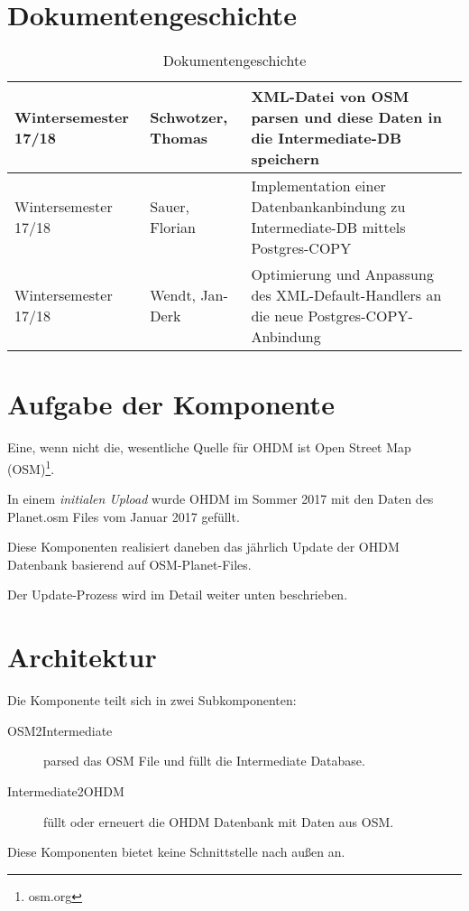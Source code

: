 \section{Dokumentengeschichte}
\begin{table}[h]
 \begin{tabular}{|l|l|p{4cm}|}
\hline
		Wintersemester 17/18 & Schwotzer, Thomas & XML-Datei von OSM parsen und diese Daten in die Intermediate-DB speichern\\
		\hline
		
		Wintersemester 17/18 & Sauer, Florian & Implementation einer Datenbankanbindung zu Intermediate-DB mittels Postgres-COPY \\
		\hline
		Wintersemester 17/18 & Wendt, Jan-Derk & Optimierung und Anpassung des XML-Default-Handlers an die neue Postgres-COPY-Anbindung\\
		\hline
 \end{tabular}
 \caption{Dokumentengeschichte}
 \end{table}

\section{Aufgabe der Komponente}
Eine, wenn nicht die, wesentliche Quelle für OHDM ist Open Street 
Map (OSM)\footnote{osm.org}.

In einem {\it initialen Upload} wurde OHDM im Sommer 2017 mit
den Daten des Planet.osm Files vom Januar 2017 gefüllt.

Diese Komponenten realisiert daneben das jährlich Update der
OHDM Datenbank basierend auf OSM-Planet-Files.

Der Update-Prozess wird im Detail weiter unten beschrieben.

\section{Architektur}
Die Komponente teilt sich in zwei Subkomponenten:

\begin{description}
\item[OSM2Intermediate] 
parsed das OSM File und füllt die
Intermediate Database.

\item[Intermediate2OHDM] füllt oder erneuert die OHDM Datenbank 
mit Daten aus OSM.

\end{description}

Diese Komponenten bietet keine Schnittstelle nach außen an.

